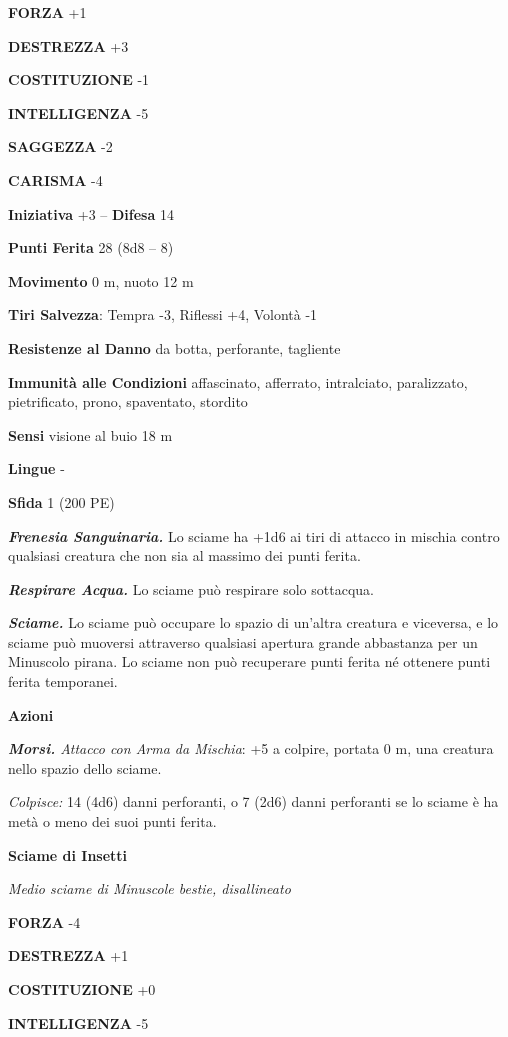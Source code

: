 \begin{multicols}{2}
\textbf{FORZA} +1

\textbf{DESTREZZA} +3

\textbf{COSTITUZIONE} -1

\textbf{INTELLIGENZA} -5

\textbf{SAGGEZZA} -2

\textbf{CARISMA} -4

\textbf{Iniziativa} +3 -- \textbf{Difesa} 14

\textbf{Punti Ferita} 28 (8d8 -- 8)

\textbf{Movimento} 0 m, nuoto 12 m

\textbf{Tiri Salvezza}: Tempra -3, Riflessi +4, Volontà -1

\textbf{Resistenze al Danno} da botta, perforante, tagliente

\textbf{Immunità alle Condizioni} affascinato, afferrato, intralciato, paralizzato, pietrificato, prono, spaventato, stordito

\textbf{Sensi} visione al buio 18 m

\textbf{Lingue} -

\textbf{Sfida} 1 (200 PE)

\emph{\textbf{Frenesia Sanguinaria.}} Lo sciame ha +1d6 ai tiri di attacco in mischia contro qualsiasi creatura che non sia al massimo dei punti ferita.

\emph{\textbf{Respirare Acqua.}} Lo sciame può respirare solo sottacqua.

\emph{\textbf{Sciame.}} Lo sciame può occupare lo spazio di un'altra creatura e viceversa, e lo sciame può muoversi attraverso qualsiasi apertura grande abbastanza per un Minuscolo pirana. Lo sciame non può recuperare punti ferita né ottenere punti ferita temporanei.

\textbf{Azioni}

\emph{\textbf{Morsi.} Attacco con Arma da Mischia}: +5 a colpire, portata 0 m, una creatura nello spazio dello sciame.

\emph{Colpisce:} 14 (4d6) danni perforanti, o 7 (2d6) danni perforanti se lo sciame è ha metà o meno dei suoi punti ferita.

\medskip\textbf{Sciame di Insetti}

\emph{Medio sciame di Minuscole bestie, disallineato}

\textbf{FORZA} -4

\textbf{DESTREZZA} +1

\textbf{COSTITUZIONE} +0

\textbf{INTELLIGENZA} -5


\end{multicols}
